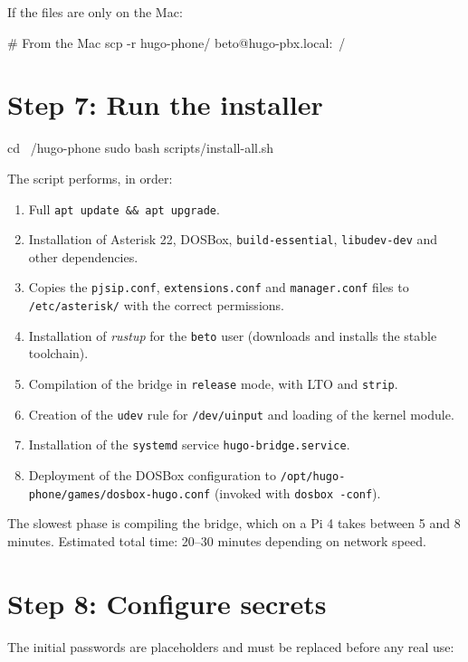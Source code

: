 If the files are only on the Mac:

\begin{shellcode}
# From the Mac
scp -r hugo-phone/ beto@hugo-pbx.local:~/
\end{shellcode}

\section{Step 7: Run the installer}

\begin{shellcode}
cd ~/hugo-phone
sudo bash scripts/install-all.sh
\end{shellcode}

The script performs, in order:

\begin{enumerate}
  \item Full \texttt{apt update \&\& apt upgrade}.
  \item Installation of Asterisk 22, DOSBox, \texttt{build-essential}, \texttt{libudev-dev} and other dependencies.
  \item Copies the \texttt{pjsip.conf}, \texttt{extensions.conf} and \texttt{manager.conf} files to \texttt{/etc/asterisk/} with the correct permissions.
  \item Installation of \emph{rustup} for the \texttt{beto} user (downloads and installs the stable toolchain).
  \item Compilation of the bridge in \texttt{release} mode, with LTO and \texttt{strip}.
  \item Creation of the \texttt{udev} rule for \texttt{/dev/uinput} and loading of the kernel module.
  \item Installation of the \texttt{systemd} service \texttt{hugo-bridge.service}.
  \item Deployment of the DOSBox configuration to \texttt{/opt/hugo-phone/games/dosbox-hugo.conf} (invoked with \texttt{dosbox -conf}).
\end{enumerate}

The slowest phase is compiling the bridge, which on a Pi 4 takes between 5 and 8 minutes. Estimated total time: 20--30 minutes depending on network speed.

\section{Step 8: Configure secrets}

The initial passwords are placeholders and must be replaced before any real use:


